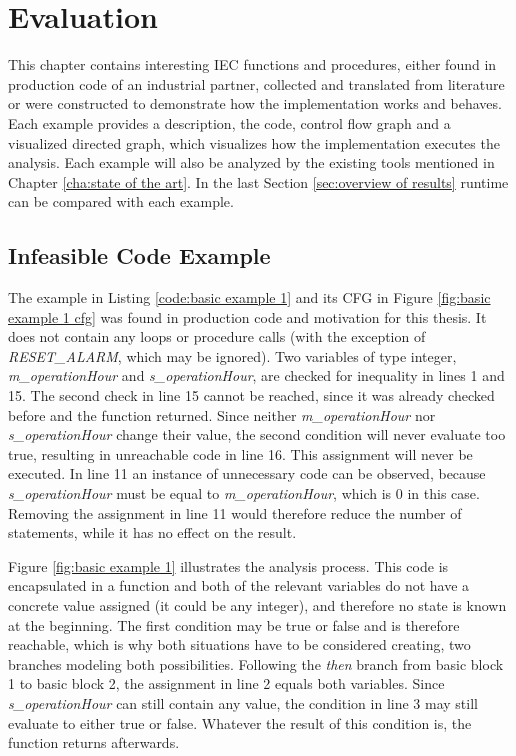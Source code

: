 
\chapter {Evaluation}
\label {cha:evaluation}
This chapter contains interesting IEC functions and procedures, either found in production code of an industrial partner, collected and translated from literature or were constructed to demonstrate how the implementation works and behaves.
Each example provides a description, the code, control flow graph and a visualized directed graph, which visualizes how the implementation executes the analysis. Each example will also be analyzed by the existing tools mentioned in Chapter \ref{cha:state of the art}. In the last Section \ref{sec:overview of results} runtime can be compared with each example.

\section{Infeasible Code Example}
The example in Listing \ref{code:basic example 1} and its CFG in Figure \ref{fig:basic example 1 cfg} was found in production code and motivation for this thesis. It does not contain any loops or procedure calls (with the exception of \emph{RESET\_ALARM}, which may be ignored). Two variables of type integer, \emph{m\_operationHour} and \emph{s\_operationHour}, are checked for inequality in lines 1 and 15. The second check in line 15 cannot be reached, since it was already checked before and the function returned. Since neither \emph{m\_operationHour} nor \emph{s\_operationHour} change their value, the second condition will never evaluate too true, resulting in unreachable code in line 16. This assignment will never be executed. 
In line 11 an instance of unnecessary code can be observed, because \emph{s\_operationHour} must be equal to \emph{m\_operationHour}, which is 0 in this case. Removing the assignment in line 11 would therefore reduce the number of statements, while it has no effect on the result.


Figure \ref{fig:basic example 1} illustrates the analysis process. This code is encapsulated in a function and both of the relevant variables do not have a concrete value assigned (it could be any integer), and therefore no state is known at the beginning. The first condition may be true or false and is therefore reachable, which is why both situations have to be considered creating, two branches modeling both possibilities. Following the \emph{then} branch from basic block 1 to basic block 2, the assignment in line 2 equals both variables. Since \emph{s\_operationHour} can still contain any value, the condition in line 3 may still evaluate to either true or false. Whatever the result of this condition is, the function returns afterwards.

